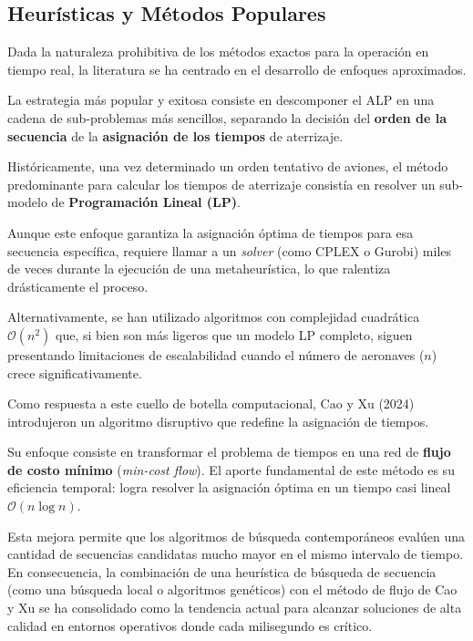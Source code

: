 \documentclass[letter, 10pt]{article}
\begin{document}
\subsection{Heur\'isticas y M\'etodos Populares}
Dada la naturaleza prohibitiva de los m\'etodos exactos para la operaci\'on en tiempo real, la literatura se ha centrado en el desarrollo de enfoques aproximados. 

La estrategia m\'as popular y exitosa consiste en descomponer el ALP en una cadena de sub-problemas m\'as sencillos, separando la decisi\'on del \textbf{orden de la secuencia} de la \textbf{asignaci\'on de los tiempos} de aterrizaje\cite{ikli2021}.

Hist\'oricamente, una vez determinado un orden tentativo de aviones, el m\'etodo predominante para calcular los tiempos de aterrizaje consist\'ia en resolver un sub-modelo de \textbf{Programaci\'on Lineal (LP)}. 

Aunque este enfoque garantiza la asignaci\'on \'optima de tiempos para esa secuencia espec\'ifica, requiere llamar a un \textit{solver} (como CPLEX o Gurobi) miles de veces durante la ejecuci\'on de una metaheur\'istica, lo que ralentiza dr\'asticamente el proceso. 

Alternativamente, se han utilizado algoritmos con complejidad cuadr\'atica $\mathcal{O}(n^2)$ que, si bien son m\'as ligeros que un modelo LP completo, siguen presentando limitaciones de escalabilidad cuando el n\'umero de aeronaves ($n$) crece significativamente.

Como respuesta a este cuello de botella computacional, Cao y Xu (2024)\cite{cao2024} introdujeron un algoritmo disruptivo que redefine la asignaci\'on de tiempos. 

Su enfoque consiste en transformar el problema de tiempos en una red de \textbf{flujo de costo m\'inimo} (\textit{min-cost flow}). El aporte fundamental de este m\'etodo es su eficiencia temporal: logra resolver la asignaci\'on \'optima en un tiempo casi lineal $\mathcal{O}(n \log n)$. 

Esta mejora permite que los algoritmos de b\'usqueda contempor\'aneos eval\'uen una cantidad de secuencias candidatas mucho mayor en el mismo intervalo de tiempo. En consecuencia, la combinaci\'on de una heur\'istica de b\'usqueda de secuencia (como una b\'usqueda local o algoritmos gen\'eticos) con el m\'etodo de flujo de Cao y Xu se ha consolidado como la tendencia actual para alcanzar soluciones de alta calidad en entornos operativos donde cada milisegundo es cr\'itico.
\end{document}
